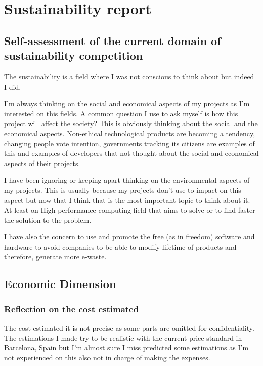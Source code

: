 \section{Sustainability report}

\subsection{Self-assessment of the current domain of sustainability competition}

The sustainability is a field where I was not conscious to think about but indeed I did.  

I'm always thinking on the social and economical aspects of my projects as I'm interested on this fields. A common question I use to ask myself is how this project will affect the society? This is obviously thinking about the social and the economical aspects. Non-ethical technological products are becoming a tendency, changing people vote intention, governments tracking its citizens are examples of this and examples of developers that not thought about the social and economical aspects of their projects.

I have been ignoring or keeping apart thinking on the environmental aspects of my projects. This is usually because my projects don't use to impact on this aspect but now that I think that is the most important topic to think about it. At least on High-performance computing field that aims to solve or to find faster the solution to the problem.

I have also the concern to use and promote the free (as in freedom) software and hardware to avoid companies to be able to modify lifetime of products and therefore, generate more e-waste.

\subsection{Economic Dimension}

\subsubsection{Reflection on the cost estimated}

The cost estimated it is not precise as some parts are omitted for confidentiality. The estimations I made try to be realistic with the current price standard in Barcelona, Spain but I'm almost sure I miss predicted some estimations as I'm not experienced on this also not in charge of making the expenses.

